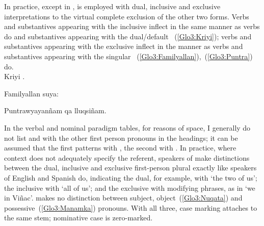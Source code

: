 \noindent
In practice, except in \CH,  is employed with dual, inclusive and exclusive interpretations to the virtual complete exclusion of the other two forms. Verbs and substantives appearing with the inclusive  inflect in the same manner as verbs do and substantives appearing with the dual/default ~(\ref{Glo3:Kriyi}); verbs and substantives appearing with the exclusive  inflect in the manner as verbs and substantives appearing with the singular ~(\ref{Glo3:Familyallan}),~(\ref{Glo3:Puntra}) do.\\

%
{Kriyi .}%
{}%
{}{}%

%
{Familyallan  suya:}%
{}%
{}{}%

%
{Puntrawyayanñam qa lluqsiñam.}%
{}%
{}{}%

\noindent
In the verbal and nominal paradigm tables, for reasons of space, I generally do not list  and  with the other first person pronouns in the headings; it can be assumed that the first patterns with , the second with . In practice, where context does not adequately specify the referent, speakers of \SYQ{} make distinctions between the dual, inclusive and exclusive first-person plural exactly like speakers of English and Spanish do, indicating the dual, for example, with  ‘the two of us’; the inclusive with  ‘all of us’; and the exclusive with modifying phrases, as in  ‘we in Viñac’. \SYQ{} makes no distinction between subject, object~(\ref{Glo3:Nuqata}) and possessive~(\ref{Glo3:Manamka}) pronouns. With all three, case marking attaches to the same stem; nominative case is zero-marked.\\

